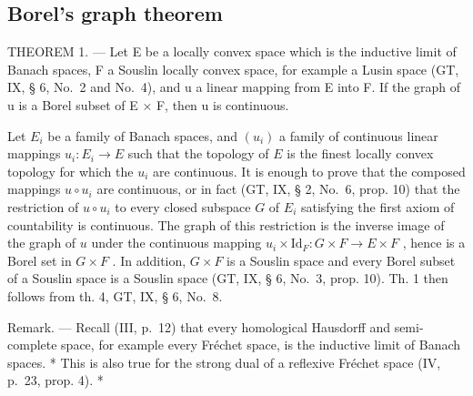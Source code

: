 \subsection{Borel's graph theorem}

THEOREM 1. --- Let E be a locally convex space which is the inductive limit of Banach spaces, F a Souslin locally convex space, for example a Lusin space (GT, IX, § 6, No.~2 and No.~4), and u a linear mapping from E into F. If the graph of u is a Borel subset of E × F, then u is continuous.

Let \(E_i\) be a family of Banach spaces, and \((u_i)\) a family of continuous linear mappings \(u_i: E_i \to E\) such that the topology of \(E\) is the finest locally convex topology for which the \(u_i\) are continuous. It is enough to prove that the composed mappings \(u \circ u_i\) are continuous, or in fact (GT, IX, § 2, No.~6, prop. 10) that the restriction of \(u \circ u_i\) to every closed subspace \(G\) of \(E_i\) satisfying the first axiom of countability is continuous. The graph of this restriction is the inverse image of the graph of \(u\) under the continuous mapping \(u_i \times \text{Id}_F: G \times F \to E \times F\) , hence is a Borel set in \(G \times F\) . In addition, \(G \times F\) is a Souslin space and every Borel subset of a Souslin space is a Souslin space (GT, IX, § 6, No.~3, prop. 10). Th. 1 then follows from th. 4, GT, IX, § 6, No.~8.

Remark. --- Recall (III, p.~12) that every homological Hausdorff and semi-complete space, for example every Fréchet space, is the inductive limit of Banach spaces. * This is also true for the strong dual of a reflexive Fréchet space (IV, p.~23, prop. 4). *

